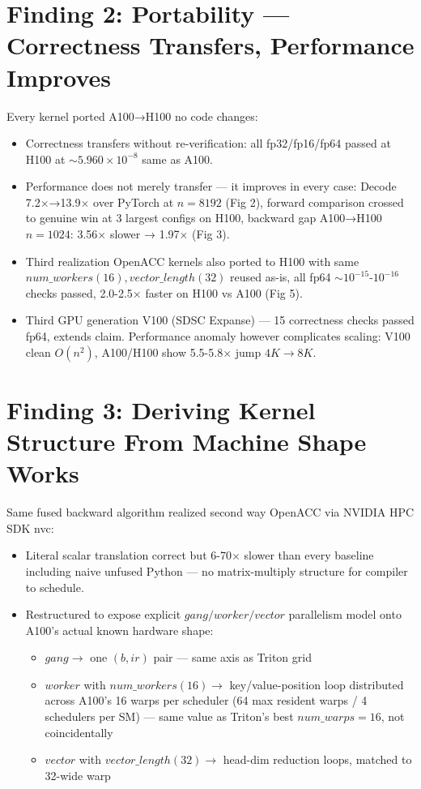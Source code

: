 \documentclass[11pt]{article}
\begin{document}
\section{Finding 2: Portability — Correctness Transfers, Performance Improves}
Every kernel ported A100→H100 no code changes:
\begin{itemize}
\item Correctness transfers without re-verification: all fp32/fp16/fp64 passed at H100 at $\sim5.960\times10^{-8}$ same as A100.
\item Performance does not merely transfer — it improves in every case: Decode 7.2$\times$→13.9$\times$ over PyTorch at $n=8192$ (Fig 2), forward comparison crossed to genuine win at 3 largest configs on H100, backward gap A100→H100 $n=1024$: 3.56$\times$ slower → 1.97$\times$ (Fig 3).
\item Third realization OpenACC kernels also ported to H100 with same $num\_workers(16), vector\_length(32)$ reused as-is, all fp64 $\sim10^{-15}$-$10^{-16}$ checks passed, 2.0-2.5$\times$ faster on H100 vs A100 (Fig 5).
\item Third GPU generation V100 (SDSC Expanse) — 15 correctness checks passed fp64, extends claim. Performance anomaly however complicates scaling: V100 clean $O(n^2)$, A100/H100 show 5.5-5.8$\times$ jump $4K\to8K$.
\end{itemize}

\section{Finding 3: Deriving Kernel Structure From Machine Shape Works}
Same fused backward algorithm realized second way OpenACC via NVIDIA HPC SDK nvc:
\begin{itemize}
\item Literal scalar translation correct but 6-70$\times$ slower than every baseline including naive unfused Python — no matrix-multiply structure for compiler to schedule.
\item Restructured to expose explicit $gang/worker/vector$ parallelism model onto A100's actual known hardware shape:
\begin{itemize}
\item $gang\to$ one $(b,ir)$ pair — same axis as Triton grid
\item $worker$ with $num\_workers(16)\to$ key/value-position loop distributed across A100's 16 warps per scheduler (64 max resident warps / 4 schedulers per SM) — same value as Triton's best $num\_warps=16$, not coincidentally
\item $vector$ with $vector\_length(32)\to$ head-dim reduction loops, matched to 32-wide warp
\end{itemize}
\end{itemize}
\end{document}
